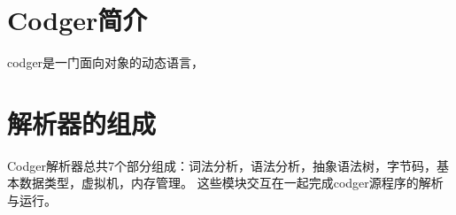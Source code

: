 \section{Codger简介}
codger是一门面向对象的动态语言，
\section{解析器的组成}
Codger解析器总共7个部分组成：词法分析，语法分析，抽象语法树，字节码，基本数据类型，虚拟机，内存管理。
这些模块交互在一起完成codger源程序的解析与运行。